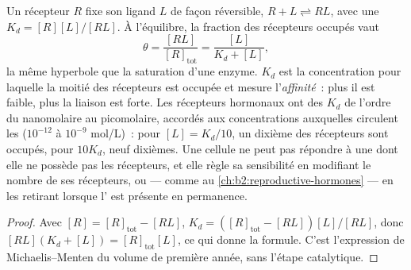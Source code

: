 \begin{theorem}\label{thm:b2:cell-signalling:occupancy}
Un récepteur $R$ fixe son ligand $L$ de façon réversible, $R + L
\rightleftharpoons RL$, avec une \emph{} $K_d =
[R][L]/[RL]$. À l'équilibre, la fraction des récepteurs occupés vaut
\[
\theta = \frac{[RL]}{[R]_{\text{tot}}} = \frac{[L]}{K_d + [L]},
\]
la même hyperbole que la saturation d'une enzyme. $K_d$ est la
concentration pour laquelle la moitié des récepteurs est occupée et
mesure l'\emph{affinité}~: plus il est faible, plus la liaison est
forte. Les récepteurs hormonaux ont des $K_d$ de l'ordre du nanomolaire
au picomolaire, accordés aux concentrations auxquelles circulent les
 ($10^{-12}$ à
$10^{-9}$ mol/L)~: pour $[L] = K_d/10$, un dixième des récepteurs sont
occupés, pour
$10K_d$, neuf dixièmes. Une cellule ne peut pas répondre à une 
dont elle ne possède pas les récepteurs, et elle règle sa sensibilité en
modifiant le nombre de ses récepteurs, ou --- comme au
\cref{ch:b2:reproductive-hormones} --- en les retirant lorsque l'
est présente en permanence.
\end{theorem}
\begin{proof}
Avec $[R] = [R]_{\text{tot}} - [RL]$, $K_d = ([R]_{\text{tot}} -
[RL])[L]/[RL]$, donc $[RL](K_d + [L]) = [R]_{\text{tot}}[L]$, ce qui
donne la formule. C'est l'expression de Michaelis--Menten du volume de
première année, sans l'étape catalytique.
\end{proof}

